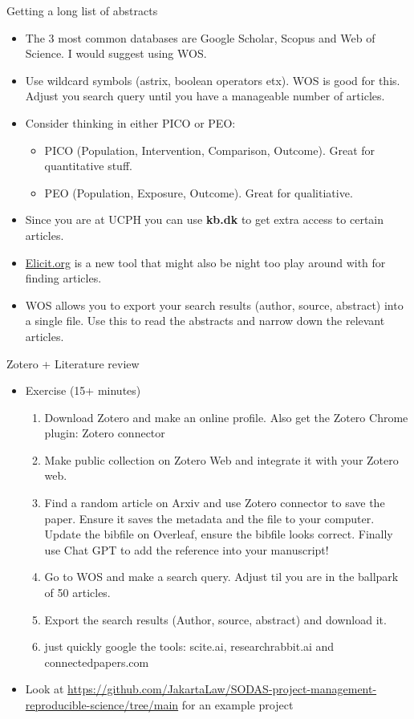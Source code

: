 \documentclass{beamer}
\begin{document}
\begin{frame}{Getting a long list of abstracts}
\begin{itemize}
    \item The 3 most common databases are Google Scholar, Scopus and Web of Science. I would suggest using WOS.
    \item Use wildcard symbols (astrix, boolean operators etx). WOS is good for this. Adjust you search query until you have a manageable number of articles.
    \item Consider thinking in either PICO or PEO:
    \begin{itemize}
        \item PICO (Population, Intervention, Comparison, Outcome). Great for quantitative stuff.
        \item PEO  (Population, Exposure, Outcome). Great for qualitiative.
    \end{itemize}
    \item Since you are at UCPH you can use \textbf{kb.dk} to get extra access to certain articles.
    \item \url{Elicit.org} is a new tool that might also be night too play around with for finding articles.
    \item WOS allows you to export your search results (author, source, abstract) into a single file. Use this to read the abstracts and narrow down the relevant articles.
\end{itemize}
\end{frame}

\begin{frame}{Zotero + Literature review}
\begin{itemize}
    \item Exercise (15+ minutes)
    \begin{enumerate}
        \item Download Zotero and make an online profile. Also get the Zotero Chrome plugin: Zotero connector
        \item Make public collection on Zotero Web and integrate it with your Zotero web.
        \item Find a random article on Arxiv and use Zotero connector to save the paper. Ensure it saves the metadata and the file to your computer. Update the bibfile on Overleaf, ensure the bibfile looks correct. Finally use Chat GPT to add the reference into your manuscript!
        \item Go to WOS and make a search query. Adjust til you are in the ballpark of 50 articles.
        \item Export the search results (Author, source, abstract) and download it.
        \item just quickly google the tools: scite.ai, researchrabbit.ai and connectedpapers.com
    \end{enumerate}
    \item Look at \url{https://github.com/JakartaLaw/SODAS-project-management-reproducible-science/tree/main} for an example project
\end{itemize}
    
\end{frame}
\end{document}
